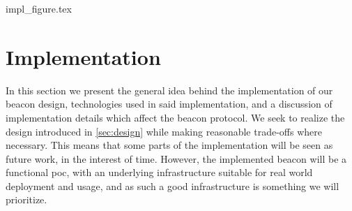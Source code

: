 {impl_figure.tex} %
\section{Implementation}%
\label{sec:implementation}

In this section we present the general idea behind the implementation of our beacon design, technologies used in said implementation, and a discussion of implementation details which affect the beacon protocol.
We seek to realize the design introduced in \cref{sec:design} while making reasonable trade-offs where necessary.
This means that some parts of the implementation will be seen as future work, in the interest of time.
However, the implemented beacon will be a functional \gls{poc}, with an underlying infrastructure suitable for real world deployment and usage, and as such a good infrastructure is something we will prioritize.